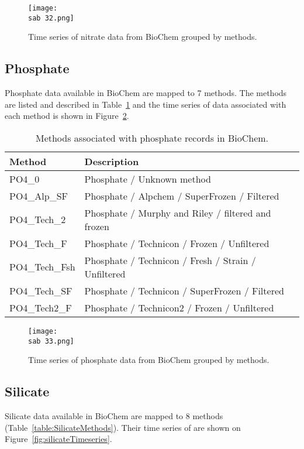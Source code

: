 \documentclass[letterpaper,portrait,11pt]{scrartcl}
\numberwithin{equation}{section}		%
\numberwithin{figure}{section}		%
\numberwithin{table}{section}				%
\newcommand{\ecomod}{\string~/ecomod_data/}   %
\newcommand{\sab}{\ecomod/mpa/sab/}   %
\begin{document}
\begin{appendices}
\begin{figure}[h]
  \label{fig:NTimeseries}
  \centering
  \texttt{[image: \\sab 32.png]}
  \caption{Time series of nitrate data from BioChem grouped by methods.}
\end{figure}

\subsection{Phosphate}

Phosphate  data available in BioChem are mapped to 7 methods. The methods are listed and described in Table~\ref{table:PhosphateMethods} and the time series of data associated with each method is shown in Figure~\ref{fig:PhosphateTimeseries}.

\begin{table}[h]
  \caption{Methods associated with phosphate records in BioChem.}
  \label{table:PhosphateMethods}
  \begin{tabular}{ll}
    Method & Description \\ \hline
    PO4\_0 & Phosphate / Unknown method  \\ 
    PO4\_Alp\_SF & Phosphate / Alpchem / SuperFrozen / Filtered \\ 
    PO4\_Tech\_2 & Phosphate / Murphy and Riley / filtered and frozen \\ 
    PO4\_Tech\_F & Phosphate / Technicon / Frozen / Unfiltered \\ 
    PO4\_Tech\_Fsh & Phosphate / Technicon / Fresh / Strain / Unfiltered \\
    PO4\_Tech\_SF & Phosphate / Technicon / SuperFrozen / Filtered \\
    PO4\_Tech2\_F & Phosphate / Technicon2 / Frozen / Unfiltered \\
  \end{tabular}
\end{table}


\begin{figure}[h]
  \centering
  \texttt{[image: \\sab 33.png]}
  \caption{Time series of phosphate data from BioChem grouped by methods.}
  \label{fig:PhosphateTimeseries}
\end{figure}


\subsection{Silicate}

Silicate data available in BioChem are mapped to 8 methods (Table~\ref{table:SilicateMethods}). Their time series of are shown on Figure~\ref{fig:silicateTimeseries}.


\end{appendices}
\end{document}
